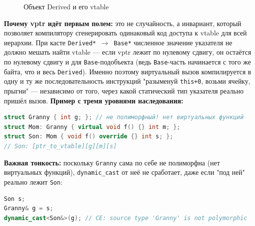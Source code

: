 \begin{figure}[htp]
\centering
{}
\caption{Объект Derived и его vtable}
\end{figure}
\textbf{Почему vptr идёт первым полем:} это не случайность, а инвариант, который позволяет компилятору сгенерировать одинаковый код доступа к vtable для всей иерархии. При касте \texttt{Derived* \(\to\) Base*} численное значение указателя не должно мешать найти vtable --- если vptr лежит по нулевому сдвигу, он остаётся по нулевому сдвигу и для \texttt{Base}-подобъекта (ведь \texttt{Base}-часть начинается с того же байта, что и весь \texttt{Derived}). Именно поэтому виртуальный вызов компилируется в одну и ту же последовательность инструкций "разыменуй \texttt{this+0}, возьми ячейку, прыгни" --- независимо от того, через какой статический тип указателя реально пришёл вызов.
\textbf{Пример с тремя уровнями наследования:}
\begin{lstlisting}[language=C++]
struct Granny { int g; }; // не полиморфный! нет виртуальных функций
struct Mom: Granny { virtual void f() {} int m; };
struct Son: Mom { void f() override {} int s; };
// Son: [ptr_to_vtable][g][m][s]
\end{lstlisting}
\textbf{Важная тонкость:} поскольку \texttt{Granny} сама по себе не полиморфна (нет виртуальных функций), \texttt{dynamic\_cast} от неё не сработает, даже если "под ней" реально лежит \texttt{Son}:
\begin{lstlisting}[language=C++]
Son s;
Granny& g = s;
dynamic_cast<Son&>(g); // CE: source type 'Granny' is not polymorphic
\end{lstlisting}
